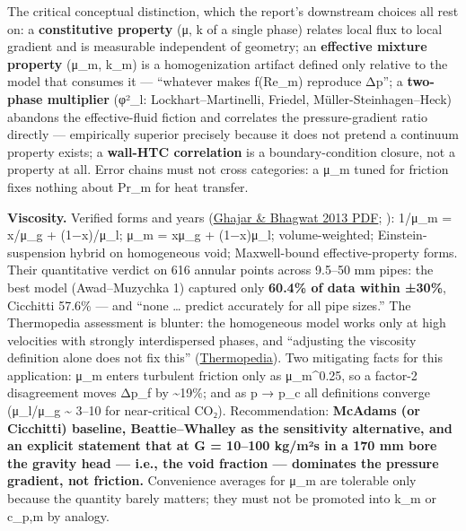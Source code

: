 The critical conceptual distinction, which the report's downstream
choices all rest on: a \textbf{constitutive property} (μ, k of a single
phase) relates local flux to local gradient and is measurable
independent of geometry; an \textbf{effective mixture property} (μ\_m,
k\_m) is a homogenization artifact defined only relative to the model
that consumes it --- ``whatever makes f(Re\_m) reproduce Δp''; a
\textbf{two-phase multiplier} (φ²\_l: Lockhart--Martinelli, Friedel,
Müller-Steinhagen--Heck) abandons the effective-fluid fiction and
correlates the pressure-gradient ratio directly --- empirically superior
precisely because it does not pretend a continuum property exists; a
\textbf{wall-HTC correlation} is a boundary-condition closure, not a
property at all. Error chains must not cross categories: a μ\_m tuned
for friction fixes nothing about Pr\_m for heat transfer.

\textbf{Viscosity.} Verified forms and years
(\href{https://aghajar.okstate.edu/sites/default/files/pub-pdfs/Ghajar\%20\%26\%20Bhagwat_HTE\%2034(13)_pp\%201044-1059\%20(2013).pdf}{Ghajar \& Bhagwat 2013 PDF}; \citealp{ghajar2013}): \citet{mcadams1942} 1/μ\_m = x/μ\_g + (1−x)/μ\_l;
\citet{cicchitti1960} μ\_m = xμ\_g + (1−x)μ\_l; \citet{dukler1964} volume-weighted; \citet{beattie1982} Einstein-suspension hybrid on
homogeneous void; \citet{awad2008} Maxwell-bound
effective-property forms. Their quantitative verdict on 616 annular
points across 9.5--50 mm pipes: the best model (Awad--Muzychka 1)
captured only \textbf{60.4\% of data within ±30\%}, Cicchitti 57.6\% ---
and ``none \ldots{} predict accurately for all pipe sizes.'' The
Thermopedia assessment is blunter: the homogeneous model works only at
high velocities with strongly interdispersed phases, and ``adjusting the
viscosity definition alone does not fix this''
(\href{https://www.thermopedia.com/de/content/37/}{Thermopedia}). Two
mitigating facts for this application: μ\_m enters turbulent friction
only as μ\_m\^{}0.25, so a factor-2 disagreement moves Δp\_f by
\textasciitilde19\%; and as p → p\_c all definitions converge (μ\_l/μ\_g
\textasciitilde{} 3--10 for near-critical CO₂). Recommendation:
\textbf{McAdams (or Cicchitti) baseline, Beattie--Whalley as the
sensitivity alternative, and an explicit statement that at G = 10--100
kg/m²s in a 170 mm bore the gravity head --- i.e., the void fraction ---
dominates the pressure gradient, not friction.} Convenience averages for
μ\_m are tolerable only because the quantity barely matters; they must
not be promoted into k\_m or c\_p,m by analogy.

